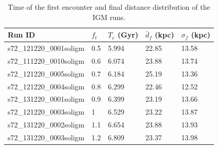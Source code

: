 \documentclass[a4paper,12pt, english]{article}
\begin{document}
\begin{table}[]
\centering
\begin{tabular}{@{}l|l|l|l|l@{}}
\toprule
Run ID                  & \(f_{t}\) & \(T_e\) (Gyr) & \(\bar{d}_f\) (kpc) & \(\sigma_f\) (kpc) \\ \midrule
s72\_121220\_0001soligm & 0.5       & 5.994         & 22.85               & 13.58              \\
s72\_111220\_0010soligm & 0.6       & 6.074         & 23.88               & 13.74              \\
s72\_121220\_0005soligm & 0.7       & 6.184         & 25.19               & 13.36              \\
s72\_121220\_0004soligm & 0.8       & 6.299         & 22.46               & 12.52              \\
s72\_131220\_0001soligm & 0.9       & 6.399         & 23.19               & 13.66              \\
s72\_121220\_0003soligm & 1         & 6.529         & 23.22               & 13.87              \\
s72\_131220\_0002soligm & 1.1       & 6.654         & 23.88               & 13.93              \\
s72\_131220\_0003soligm & 1.2       & 6.809         & 23.37               & 13.98              \\ \bottomrule
\end{tabular}
\caption{Time of the first encounter and final distance distribution of the IGM runs.}
\label{tab:final-results}
\end{table}\par
\newpage
\phantom{Just to get a new page don't mind me}
\newpage
\end{document}

